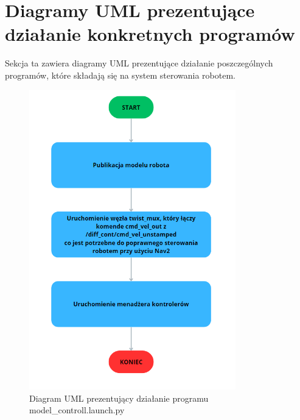 \documentclass[a4paper,twoside,12pt]{book}
\begin{document}
\section{Diagramy UML prezentujące działanie konkretnych programów}
Sekcja ta zawiera diagramy UML prezentujące działanie poszczególnych programów, które składają się na system sterowania robotem. 
\begin{figure}[!hb]
	\centering
	\includegraphics[width=0.8\textwidth]{images/uml-model.png}
	\caption{Diagram UML prezentujący działanie programu model\_controll.launch.py}
	\label{fig:diagram-model}
\end{figure}
\end{document}
